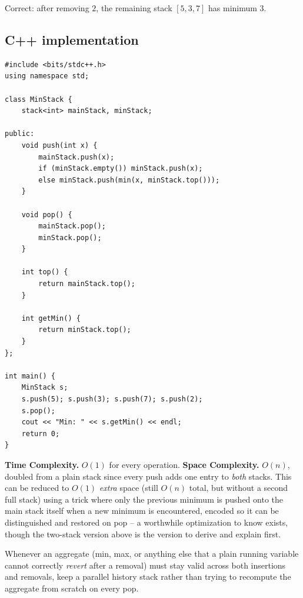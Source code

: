 Correct: after removing $2$, the remaining stack $[5,3,7]$ has minimum
$3$.

\subsection*{C++ implementation}

\begin{lstlisting}
#include <bits/stdc++.h>
using namespace std;

class MinStack {
    stack<int> mainStack, minStack;

public:
    void push(int x) {
        mainStack.push(x);
        if (minStack.empty()) minStack.push(x);
        else minStack.push(min(x, minStack.top()));
    }

    void pop() {
        mainStack.pop();
        minStack.pop();
    }

    int top() {
        return mainStack.top();
    }

    int getMin() {
        return minStack.top();
    }
};

int main() {
    MinStack s;
    s.push(5); s.push(3); s.push(7); s.push(2);
    s.pop();
    cout << "Min: " << s.getMin() << endl;
    return 0;
}
\end{lstlisting}

\begin{complexitybox}
\textbf{Time Complexity.} $O(1)$ for every operation.
\textbf{Space Complexity.} $O(n)$, doubled from a plain stack since every
push adds one entry to \emph{both} stacks. This can be reduced to
$O(1)$ \emph{extra} space (still $O(n)$ total, but without a second full
stack) using a trick where only the previous minimum is pushed onto the
main stack itself when a new minimum is encountered, encoded so it can be
distinguished and restored on pop -- a worthwhile optimization to know
exists, though the two-stack version above is the version to derive and
explain first.
\end{complexitybox}

\begin{takeawaybox}
Whenever an aggregate (min, max, or anything else that a plain running
variable cannot correctly \emph{revert} after a removal) must stay valid
across both insertions and removals, keep a parallel history stack rather
than trying to recompute the aggregate from scratch on every pop.
\end{takeawaybox}
